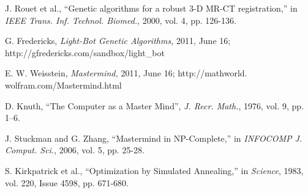 \begin{thebibliography}{9} %


J. Rouet et al., ``Genetic algorithms for a robust 3-D MR-CT registration,'' in \textit{IEEE Trans. Inf. Technol. Biomed.}, 2000, vol. 4, pp. 126-136.

G. Fredericks, \textit{Light-Bot Genetic Algorithms,} 2011, June 16;   http://gfredericks.com/sandbox/light\_bot 

E. W. Weisstein, \textit{Mastermind,} 2011, June 16; http://mathworld.\\wolfram.com/Mastermind.html


D. Knuth, ``The Computer as a Master Mind'', \textit{J. Recr. Math.}, 1976, vol. 9, pp. 1–6.

J. Stuckman and G. Zhang, ``Mastermind in NP-Complete,'' in \textit{INFOCOMP J. Comput. Sci.}, 2006, vol. 5, pp. 25-28.

S. Kirkpatrick et al., ``Optimization by Simulated Annealing,'' in \textit{Science}, 1983, vol. 220, Issue 4598, pp. 671-680.


\end{thebibliography}
